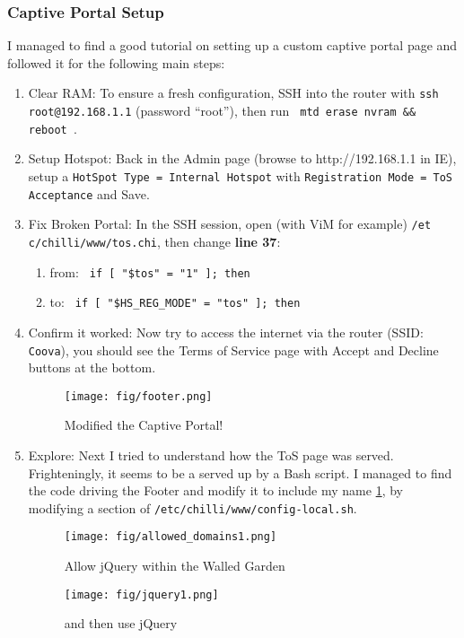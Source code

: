 \subsubsection{Captive Portal Setup}
I managed to find a good tutorial \cite{article:CoovaHotSpotSetup} on setting up a custom captive
portal page and followed it for the following main steps:
\begin{enumerate}
\item{Clear RAM:}  To ensure a fresh configuration, SSH into the router with \texttt{ssh
root@192.168.1.1} (password ``root''), then run \texttt{ mtd erase nvram \&\& reboot }.
\item{Setup Hotspot:}  Back in the Admin page (browse to http://192.168.1.1 in IE), setup a
\texttt{HotSpot Type = Internal Hotspot} with \texttt{Registration Mode = ToS Acceptance} and Save.
\item{Fix Broken Portal:}  In the SSH session, open (with ViM for example)
\texttt{/et c/chilli/www/tos.chi}, then change \textbf{line 37}:
  \begin{enumerate}
  \item{from:} \texttt{ if [ "\$tos" = "1" ]; then }
  \item{to:} \texttt{ if [ "\$HS\_REG\_MODE" = "tos" ]; then}
  \end{enumerate}
\item{Confirm it worked:}  Now try to access the internet via the router (SSID: \texttt{Coova}), you
should see the Terms of Service page with Accept and Decline buttons at the bottom.

\begin{figure}[ht!]
\centering
\texttt{[image: fig/footer.png]}
\caption{Modified the Captive Portal!}
\label{fig:footer}
\end{figure}

\item{Explore:}  Next I tried to understand how the ToS page was served. Frighteningly, it seems to
be a served up by a Bash script. I managed to find the code driving the Footer and modify it to
include my name \ref{fig:footer}, by modifying a section of
\texttt{/etc/chilli/www/config-local.sh}.

\begin{figure}[ht!]
\centering
\texttt{[image: fig/allowed\_domains1.png]}
\caption{Allow jQuery within the Walled Garden}
\label{fig:allow_jquery}
\end{figure}

\begin{figure}[ht!]
\centering
\texttt{[image: fig/jquery1.png]}
\caption{and then use jQuery}
\label{fig:use_jquery}
\end{figure}


\end{enumerate}
